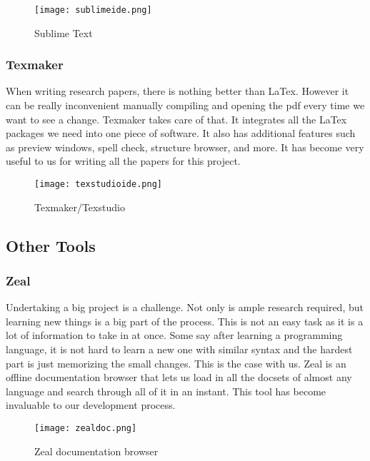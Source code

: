 \documentclass[letterpaper, 12pt]{article}
\begin{document}
\begin{figure}
    \centering
	\texttt{[image: sublimeide.png]}
    \caption{Sublime Text}
\end{figure}

\newpage

\subsubsection{Texmaker}
When writing research papers, there is nothing better than LaTex. However it can be really inconvenient manually compiling and opening the pdf every time we want to see a change. Texmaker takes care of that. It integrates all the LaTex packages we need into one piece of software. It also has additional features such as preview windows, spell check, structure browser, and more. It has become very useful to us for writing all the papers for this project.

\begin{figure}
    \centering
	\texttt{[image: texstudioide.png]}
    \caption{Texmaker/Texstudio}
\end{figure}

\newpage

\subsection{Other Tools}

\subsubsection{Zeal}
Undertaking a big project is a challenge. Not only is ample research required, but learning new things is a big part of the process. This is not an easy task as it is a lot of information to take in at once. Some say after learning a programming language, it is not hard to learn a new one with similar syntax and the hardest part is just memorizing the small changes. This is the case with us. Zeal is an offline documentation browser that lets us load in all the docsets of almost any language and search through all of it in an instant. This tool has become invaluable to our development process. 

\begin{figure}
    \centering
	\texttt{[image: zealdoc.png]}
    \caption{Zeal documentation browser}
\end{figure}

\newpage
\end{document}
